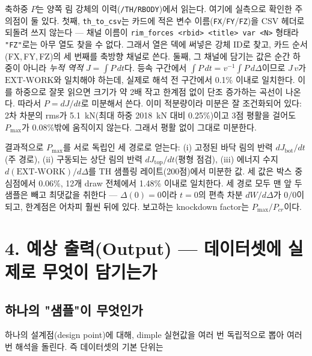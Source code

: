 \documentclass[11pt]{article}
\begin{document}
\begin{enumerate}
      축하중 $P$는 양쪽 림 강체의 이력(\texttt{/TH/RBODY})에서 읽는다. 여기에
      실측으로 확인한 주의점이 둘 있다. 첫째, \texttt{th\_to\_csv}는 카드에 적은
      변수 이름(\texttt{FX}/\texttt{FY}/\texttt{FZ})을 CSV 헤더로 되돌려 쓰지
      않는다 --- 채널 이름이 \texttt{rim\_forces <rbid> <title> var <N>} 형태라
      \texttt{"FZ"}로는 아무 열도 찾을 수 없다. 그래서 열은 덱에 써넣은 강체
      ID로 찾고, 카드 순서(FX,\,FY,\,FZ)의 세 번째를 축방향 채널로 쓴다.
      둘째, 그 채널에 담기는 값은 순간 하중이 아니라 \emph{누적 역적}
      $J = \int P\,dt$다. 등속 구간에서 $\int P\,dt = v^{-1}\!\int P\,d\Delta$이므로
      $J\,v$가 $\mathrm{EXT\text{-}WORK}$와 일치해야 하는데, 실제로 해석 전
      구간에서 0.1\% 이내로 일치한다. 이를 하중으로 잘못 읽으면 크기가 약 2배
      작고 한계점 없이 단조 증가하는 곡선이 나온다. 따라서 $P = dJ/dt$로
      미분해서 쓴다. 이미 적분량이라 미분은 잘 조건화되어 있다: 2차 차분의
      rms가 5.1~kN(최대 하중 2018~kN 대비 0.25\%)이고 3점 평활을 걸어도
      $P_{\max}$가 0.08\%밖에 움직이지 않는다. 그래서 평활 없이 그대로 미분한다.

      결과적으로 $P_{\max}$를 서로 독립인 세 경로로 얻는다: (i) 고정된 바닥
      림의 반력 $dJ_{\mathrm{bot}}/dt$(주 경로), (ii) 구동되는 상단 림의 반력
      $dJ_{\mathrm{top}}/dt$(평형 점검), (iii) 에너지 수지
      $d(\mathrm{EXT\text{-}WORK})/d\Delta$를 TH 샘플링 레이트(200점)에서 미분한 값.
      세 값은 박스 중심점에서 0.06\%, 12개 draw 전체에서 1.48\% 이내로 일치한다.
      세 경로 모두 맨 앞 두 샘플은 빼고 최댓값을 취한다 --- $\Delta(0){=}0$이라
      $t{=}0$의 편측 차분 $dW/d\Delta$가 $0/0$이 되고, 한계점은 어차피 훨씬 뒤에
      있다. 보고하는 knockdown factor는 $P_{\max}/P_{cr}$이다.
\end{enumerate}

\section{4. 예상 출력(Output) --- 데이터셋에 실제로 무엇이 담기는가}

\subsection{하나의 "샘플"이 무엇인가}

하나의 설계점(design point)에 대해, dimple 실현값을 여러 번 독립적으로 뽑아
여러 번 해석을 돌린다. 즉 데이터셋의 기본 단위는
\end{document}
